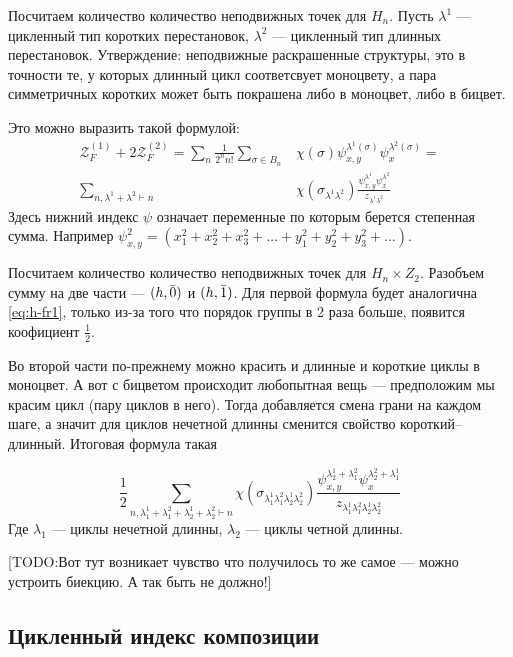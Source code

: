 Посчитаем количество количество неподвижных точек для $H_n$. Пусть $\lambda^1$
--- цикленный тип коротких перестановок, $\lambda^2$ --- цикленный тип длинных
перестановок. Утверждение: неподвижные раскрашенные структуры, это в точности
те, у которых длинный цикл соответсвует моноцвету, а пара симметричных коротких 
может быть покрашена либо в моноцвет, либо в бицвет.

Это можно выразить такой формулой:
\begin{equation}
\label{eq:h-fr1}
\begin{split}
\mathcal Z_F^{(1)} + 2\mathcal Z_F^{(2)} = 
\sum_{n}\frac{1}{2^{n}n!}\sum_{\sigma \in B_n}&\chi(\sigma)
\psi_{x, y}^{\lambda^1(\sigma)} \psi_{x}^{\lambda^2(\sigma)} = \\
\sum_{n, \lambda^1 + \lambda^2 \vdash n}&\chi(\sigma_{\lambda^1 \lambda^2})
\frac{\psi_{x, y}^{\lambda^1} \psi_{x}^{\lambda^2}}{z_{\lambda^1 \lambda^2}}
\end{split}
\end{equation}
Здесь нижний индекс $\psi$ означает переменные по которым берется степенная
сумма. Например $\psi_{x, y}^2 =  (x_1^2 + x_2^2 + x_3^2 + \dots + y_1^2 + y_2^2
+ y_3^2 + \dots)$.

Посчитаем количество количество неподвижных точек для $H_n \times Z_2$. Разобъем
сумму на две части --- $(h, \Bar 0)$ и $(h, \Bar 1)$. Для первой формула будет
аналогична \ref{eq:h-fr1}, только из-за того что порядок группы в 2 раза больше,
появится коофициент $\frac{1}{2}$.

Во второй части по-прежнему можно красить и длинные и короткие циклы в моноцвет.
А вот с бицветом происходит любопытная вещь --- предположим мы красим цикл (пару
циклов в него). Тогда добавляется смена грани на каждом шаге, а значит для
циклов нечетной длинны сменится свойство короткий--длинный. Итоговая формула
такая 

$$
\frac{1}{2}
\sum_{n, \lambda_1^1 + \lambda_1^2 + \lambda_2^1 + \lambda_2^2 \vdash
n}\chi(\sigma_{\lambda_1^1 \lambda_1^2 \lambda_2^1 \lambda_2^2})
\frac{\psi_{x, y}^{\lambda_2^1 + \lambda_1^2} \psi_{x}^{\lambda_2^2 + 
\lambda_1^1}}{z_{\lambda_1^1 \lambda_1^2 \lambda_2^1 \lambda_2^2}}
$$
Где $\lambda_1$ --- циклы нечетной длинны, $\lambda_2$ ---
циклы четной длинны.

[TODO:Вот тут возникает чувство что получилось то же самое --- можно устроить
биекцию. А так быть не должно!]

\subsection{Цикленный индекс композиции}
